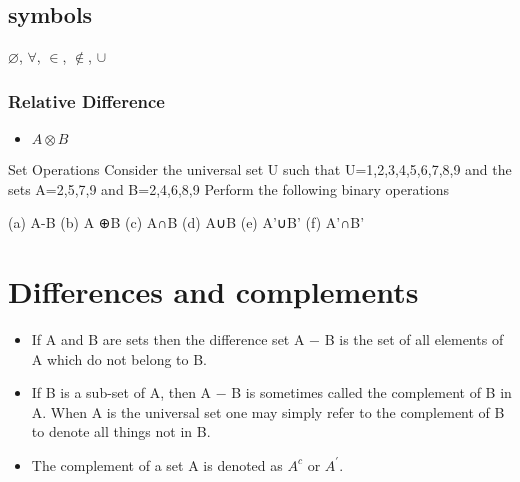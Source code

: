 \subsection*{symbols}
$\varnothing$,
$\forall$,
$\in$,
$\notin$,
$\cup$


\newpage



\subsubsection*{Relative Difference}
\begin{itemize}
\item $ A \otimes B$
\end{itemize}

Set Operations
Consider the universal set U such that U={1,2,3,4,5,6,7,8,9}  and the sets A={2,5,7,9}  and  B={2,4,6,8,9} 
Perform the following binary operations

(a) A-B
(b) A ⊕B
(c) A∩B
(d) A∪B
(e) A'∪B'
(f) A'∩B'



\section{Differences and complements}


	\begin{itemize}
		\item If A and B are sets then the difference set A − B is the set of all elements
		of A which do not belong to B.
		\item If B is a sub-set of A, then A − B is sometimes called the complement of
		B in A. When A is the universal set one may simply refer to the
		complement of B to denote all things not in B. \item The complement of a set A
		is denoted as $A^c$ or $A^{\prime}$.
	\end{itemize}

